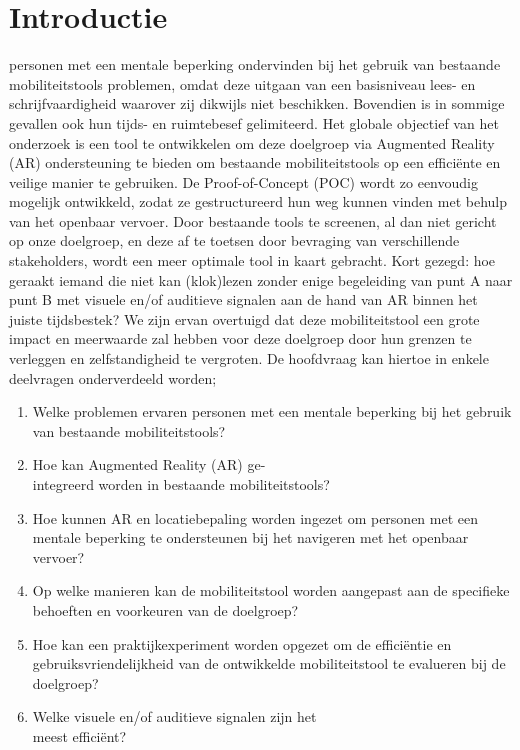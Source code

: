 
\section{Introductie}%
\label{sec:introductie}

    personen met een mentale beperking ondervinden bij het gebruik van bestaande mobiliteits\-tools problemen, omdat deze uitgaan van een basisniveau lees- en schrijfvaardigheid waarover zij dikwijls niet beschikken. 
    Bovendien is in sommige gevallen ook hun tijds- en ruimtebesef gelimiteerd. 
    Het globale objectief van het onderzoek is een tool te ontwikkelen om deze doelgroep via Augmented Reality (AR) ondersteuning te bieden om bestaande mobiliteitstools op een efficiënte en veilige manier te gebruiken.
    De Proof-of-Concept (POC) wordt zo eenvoudig mogelijk ontwikkeld, zodat ze gestructureerd hun weg kunnen vinden met behulp van het openbaar vervoer. 
    Door bestaande tools te screenen, al dan niet gericht op onze doelgroep, en deze af te toetsen door bevraging van verschillende stakeholders, wordt een meer optimale tool in kaart gebracht. 
    Kort gezegd: hoe geraakt iemand die niet kan (klok)lezen zonder enige begeleiding van punt A naar punt B met visuele en/of auditieve signalen aan de hand van AR binnen het juiste tijdsbestek? We zijn ervan overtuigd dat deze mobiliteitstool een grote impact en meerwaarde zal hebben voor deze doelgroep door hun grenzen te verleggen en zelfstandigheid te vergroten. De hoofdvraag kan hiertoe in enkele deelvragen onderverdeeld worden;
    
    \begin{enumerate}
        \item Welke problemen ervaren personen met een mentale beperking bij het gebruik van bestaande mobiliteitstools?
        \item Hoe kan Augmented Reality (AR) ge-\\integreerd worden in bestaande mobiliteits\-tools?
        \item Hoe kunnen AR en locatiebepaling worden ingezet om personen met een mentale beperking te ondersteunen bij het navigeren met het openbaar vervoer?
        \item Op welke manieren kan de mobiliteitstool worden aangepast aan de specifieke behoeften en voorkeuren van de doelgroep?
        \item Hoe kan een praktijkexperiment worden opgezet om de efficiëntie en gebruiksvriendelijkheid van de ontwikkelde mobiliteitstool te evalueren bij de doelgroep?
        \item Welke visuele en/of auditieve signalen zijn het \\meest efficiënt?
    \end{enumerate}

